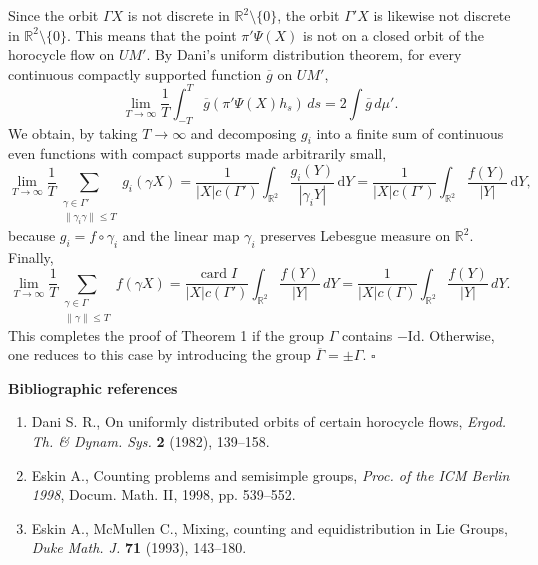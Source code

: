 \documentclass[11pt]{article}
\theoremstyle{remark}
\newcommand{\R}{\mathbb{R}}
\newcommand{\rd}{\mathrm{d}}
\newcommand{\Id}{\mathrm{Id}}
\newcommand{\card}{\operatorname{card}}
\begin{document}
Since the orbit $\Gamma X$ is not discrete in $\R^2\setminus\{0\}$, the orbit $\Gamma'X$ is likewise not discrete in $\R^2\setminus\{0\}$. This means that the point $\pi'\Psi(X)$ is not on a closed orbit of the horocycle flow on $UM'$. By Dani's uniform distribution theorem, for every continuous compactly supported function $\overline g$ on $UM'$,
\[
\lim_{T\to\infty}\frac1T\int_{-T}^{T}\overline g(\pi'\Psi(X)h_s)\,ds
=2\int \overline g\,d\mu'.
\]
We obtain, by taking $T\to\infty$ and decomposing $g_i$ into a finite sum of continuous even functions with compact supports made arbitrarily small,
\[
\lim_{T\to\infty}\frac1T
\sum_{\substack{\gamma\in\Gamma'\\ \|\gamma_i\gamma\|\le T}}g_i(\gamma X)
=\frac{1}{|X|c(\Gamma')}\int_{\R^2}\frac{g_i(Y)}{|\gamma_iY|}\,\rd Y
=\frac{1}{|X|c(\Gamma')}\int_{\R^2}\frac{f(Y)}{|Y|}\,\rd Y,
\]
because $g_i=f\circ\gamma_i$ and the linear map $\gamma_i$ preserves Lebesgue measure on $\R^2$. Finally,
\[
\lim_{T\to\infty}\frac1T
\sum_{\substack{\gamma\in\Gamma\\ \|\gamma\|\le T}}f(\gamma X)
=\frac{\card I}{|X|c(\Gamma')}\int_{\R^2}\frac{f(Y)}{|Y|}\,dY
=\frac{1}{|X|c(\Gamma)}\int_{\R^2}\frac{f(Y)}{|Y|}\,dY.
\]
This completes the proof of Theorem 1 if the group $\Gamma$ contains $-\Id$. Otherwise, one reduces to this case by introducing the group $\overline\Gamma=\pm\Gamma$.
\hfill$\square$

\begin{center}
\textbf{Bibliographic references}
\end{center}

\begin{enumerate}
\item Dani S. R., On uniformly distributed orbits of certain horocycle flows, \emph{Ergod. Th. \& Dynam. Sys.} \textbf{2} (1982), 139--158.
\item Eskin A., Counting problems and semisimple groups, \emph{Proc. of the ICM Berlin 1998}, Docum. Math. II, 1998, pp. 539--552.
\item Eskin A., McMullen C., Mixing, counting and equidistribution in Lie Groups, \emph{Duke Math. J.} \textbf{71} (1993), 143--180.
\end{enumerate}
\end{document}

